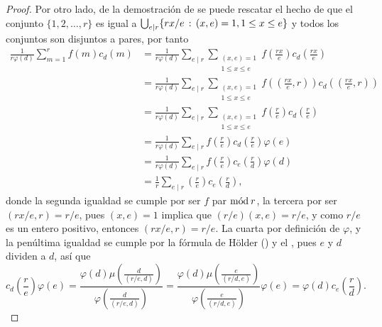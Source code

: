 \begin{proof}
Por otro lado, de la demostración de  se puede rescatar el hecho de que el conjunto $\{ 1,2,\ldots,r \}$ es igual a $\bigcup_{e \mid r} \{ rx/e \, : \, (x,e)=1, 1 \le x \le e \}$ y todos los conjuntos son disjuntos a pares, por tanto
\begin{equation*}
\begin{split}
    \frac{1}{r \varphi(d)}\sum_{m=1}^{r} f(m) c_d(m) &= \frac{1}{r \varphi(d)}\sum_{e \mid r} \sum_{\substack{(x,e)=1 \\ 1 \le x \le e}} f \left( \frac{rx}{e} \right) c_d \left( \frac{rx}{e} \right) \\
                               &= \frac{1}{r \varphi(d)}\sum_{e \mid r} \sum_{\substack{(x,e)=1 \\ 1 \le x \le e}} f \left( \left( \frac{rx}{e},r \right) \right) c_d \left( \left( \frac{rx}{e},r \right) \right) \\
                               &= \frac{1}{r \varphi(d)}\sum_{e \mid r} \sum_{\substack{(x,e)=1 \\ 1 \le x \le e}} f \left( \frac{r}{e} \right) c_d \left( \frac{r}{e} \right) \\
                               &= \frac{1}{r \varphi(d)}\sum_{e \mid r} f \left( \frac{r}{e} \right) c_d \left( \frac{r}{e} \right) \varphi(e) \\
                               &= \frac{1}{r \varphi(d)}\sum_{e \mid r} f \left( \frac{r}{e} \right) c_e \left( \frac{r}{d} \right) \varphi(d) \\
                               &= \frac{1}{r}\sum_{e \mid r} \left( \frac{r}{e} \right) c_e \left( \frac{r}{d} \right),
\end{split}
\end{equation*}
donde la segunda igualdad se cumple por ser $f$ par $\mathrm{m\acute{o}d\:}r$, la tercera por ser $(rx/e,r)=r/e$, pues $(x,e)=1$ implica que $(r/e)(x,e)=r/e$, y como $r/e$ es un entero positivo, entonces $(rx/e,r)=r/e$. La cuarta por definición de $\varphi$, y la penúltima igualdad se cumple por la fórmula de Hölder () y el , pues $e$ y $d$ dividen a $d$, así que
\begin{equation}\label{eq:holder}
    c_d \left( \frac{r}{e} \right) \varphi(e) = \frac{\varphi(d)\mu \left( \displaystyle \frac{d}{(r/e,d)} \right)}{\varphi \left( \displaystyle \frac{d}{(r/e,d)} \right)} = \frac{\varphi(d)\mu \left( \displaystyle \frac{e}{(r/d,e)} \right)}{\varphi \left( \displaystyle \frac{e}{(r/d,e)} \right)} \varphi(e) = \varphi(d) c_e \left( \frac{r}{d} \right).
\end{equation}
\end{proof}

